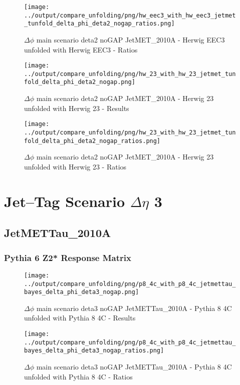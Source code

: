 \documentclass[11pt]{book}
\begin{document}
\begin{figure}[ht]
\centering
\texttt{[image: ../output/compare\_unfolding/png/hw\_eec3\_with\_hw\_eec3\_jetmet\_tunfold\_delta\_phi\_deta2\_nogap\_ratios.png]}
\caption{$\Delta\phi$ main scenario deta2 noGAP JetMET\_2010A - Herwig EEC3 unfolded with Herwig EEC3 - Ratios}
\label{hw_eec3_hw_eec3_jetmet_tunfold_delta_phi_deta2_nogap_b}
\end{figure}

\begin{figure}[ht]
\centering
\texttt{[image: ../output/compare\_unfolding/png/hw\_23\_with\_hw\_23\_jetmet\_tunfold\_delta\_phi\_deta2\_nogap.png]}
\caption{$\Delta\phi$ main scenario deta2 noGAP JetMET\_2010A - Herwig 23 unfolded with Herwig 23 - Results}
\label{hw_23_hw_23_jetmet_tunfold_delta_phi_deta2_nogap_a}
\end{figure}

\begin{figure}[ht]
\centering
\texttt{[image: ../output/compare\_unfolding/png/hw\_23\_with\_hw\_23\_jetmet\_tunfold\_delta\_phi\_deta2\_nogap\_ratios.png]}
\caption{$\Delta\phi$ main scenario deta2 noGAP JetMET\_2010A - Herwig 23 unfolded with Herwig 23 - Ratios}
\label{hw_23_hw_23_jetmet_tunfold_delta_phi_deta2_nogap_b}
\end{figure}




\newpage
\chapter{Jet--Tag Scenario $\Delta\eta$ 3}
\section{JetMETTau\_2010A}
\subsection{Pythia 6 Z2* Response Matrix}



\begin{figure}[ht]
\centering
\texttt{[image: ../output/compare\_unfolding/png/p8\_4c\_with\_p8\_4c\_jetmettau\_bayes\_delta\_phi\_deta3\_nogap.png]}
\caption{$\Delta\phi$ main scenario deta3 noGAP JetMETTau\_2010A - Pythia 8 4C unfolded with Pythia 8 4C - Results}
\label{p8_p8_jetmettau_bayes_delta_phi_deta3_nogap_a}
\end{figure}

\begin{figure}[ht]
\centering
\texttt{[image: ../output/compare\_unfolding/png/p8\_4c\_with\_p8\_4c\_jetmettau\_bayes\_delta\_phi\_deta3\_nogap\_ratios.png]}
\caption{$\Delta\phi$ main scenario deta3 noGAP JetMETTau\_2010A - Pythia 8 4C unfolded with Pythia 8 4C - Ratios}
\label{p8_p8_jetmettau_bayes_delta_phi_deta3_nogap_b}
\end{figure}
\end{document}
